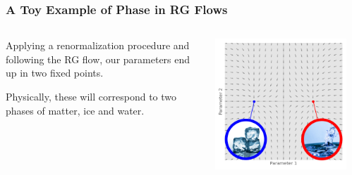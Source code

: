 \documentclass[aspectratio=169, 12pt]{beamer}
\begin{document}
\begin{frame}

    \frametitle{A Toy Example of Phase in RG Flows}

    \begin{columns}
    \begin{column}{.6\textwidth}
    
        Applying a renormalization procedure and following the RG flow, our parameters end up in two fixed points. 

        \vspace{1em}

        Physically, these will correspond to two phases of matter, ice and water. 
        
    \end{column}
    \begin{column}{.4\textwidth}
        \includegraphics[width=0.9\textwidth]{images/labeled-flowed-fixed-points.png}
    \end{column}
    \end{columns}

\end{frame}
\end{document}
